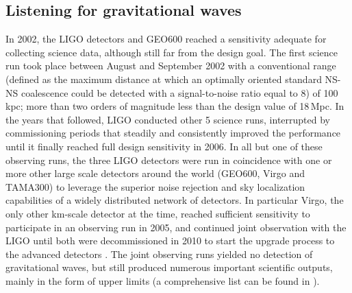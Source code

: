 \subsection{Listening for gravitational waves}
In 2002, the LIGO detectors and GEO600 reached a sensitivity adequate for collecting science data, although still far from the design goal.
The first science run took place between August and September 2002 with a conventional range (defined as the maximum distance at which an optimally oriented standard NS-NS coalescence could be detected with a signal-to-noise ratio equal to 8) of 100\,kpc; more than two orders of magnitude less than the design value of 18\,Mpc.
In the years that followed, LIGO conducted other 5 science runs, interrupted by commissioning periods that steadily and consistently improved the performance until it finally reached full design sensitivity in 2006.
In all but one of these observing runs, the three LIGO detectors were run in coincidence with one or more other large scale detectors around the world (GEO600, Virgo and TAMA300) to leverage the superior noise rejection and sky localization capabilities of a widely distributed network of detectors.
In particular Virgo, the only other km-scale detector at the time, reached sufficient sensitivity to participate in an observing run in 2005, and continued joint observation with the LIGO until both were decommissioned in 2010 to start the upgrade process to the advanced detectors \cite{Abbott_2004,Abbott_2005,Abbott_2006,Abbott_2008,Abadie_2010}.
The joint observing runs yielded no detection of gravitational waves, but still produced numerous important scientific outputs, mainly in the form of upper limits (a comprehensive list can be found in \cite{LSCPublications}).

